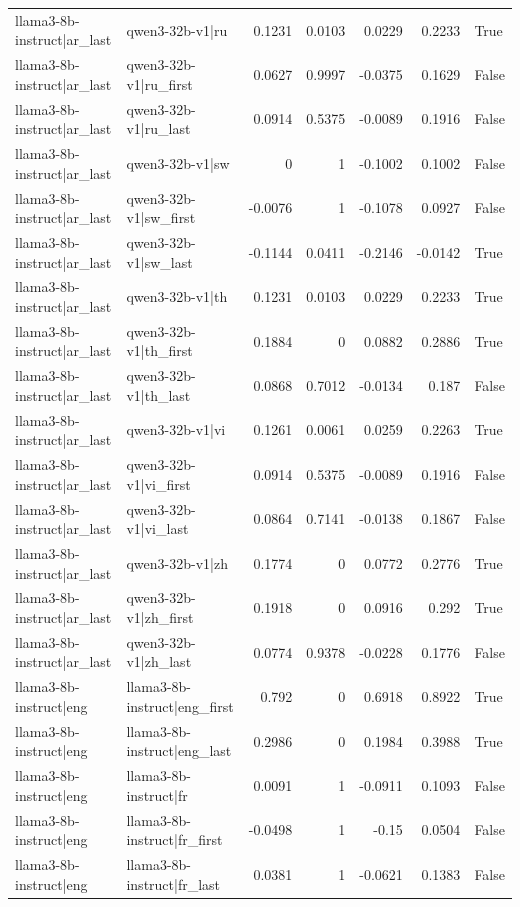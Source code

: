 \begin{table}
\begin{tabular}{l l r r r r l}
llama3-8b-instruct|ar_last & qwen3-32b-v1|ru & 0.1231 & 0.0103 & 0.0229 & 0.2233 & True \\
llama3-8b-instruct|ar_last & qwen3-32b-v1|ru_first & 0.0627 & 0.9997 & -0.0375 & 0.1629 & False \\
llama3-8b-instruct|ar_last & qwen3-32b-v1|ru_last & 0.0914 & 0.5375 & -0.0089 & 0.1916 & False \\
llama3-8b-instruct|ar_last & qwen3-32b-v1|sw & 0 & 1 & -0.1002 & 0.1002 & False \\
llama3-8b-instruct|ar_last & qwen3-32b-v1|sw_first & -0.0076 & 1 & -0.1078 & 0.0927 & False \\
llama3-8b-instruct|ar_last & qwen3-32b-v1|sw_last & -0.1144 & 0.0411 & -0.2146 & -0.0142 & True \\
llama3-8b-instruct|ar_last & qwen3-32b-v1|th & 0.1231 & 0.0103 & 0.0229 & 0.2233 & True \\
llama3-8b-instruct|ar_last & qwen3-32b-v1|th_first & 0.1884 & 0 & 0.0882 & 0.2886 & True \\
llama3-8b-instruct|ar_last & qwen3-32b-v1|th_last & 0.0868 & 0.7012 & -0.0134 & 0.187 & False \\
llama3-8b-instruct|ar_last & qwen3-32b-v1|vi & 0.1261 & 0.0061 & 0.0259 & 0.2263 & True \\
llama3-8b-instruct|ar_last & qwen3-32b-v1|vi_first & 0.0914 & 0.5375 & -0.0089 & 0.1916 & False \\
llama3-8b-instruct|ar_last & qwen3-32b-v1|vi_last & 0.0864 & 0.7141 & -0.0138 & 0.1867 & False \\
llama3-8b-instruct|ar_last & qwen3-32b-v1|zh & 0.1774 & 0 & 0.0772 & 0.2776 & True \\
llama3-8b-instruct|ar_last & qwen3-32b-v1|zh_first & 0.1918 & 0 & 0.0916 & 0.292 & True \\
llama3-8b-instruct|ar_last & qwen3-32b-v1|zh_last & 0.0774 & 0.9378 & -0.0228 & 0.1776 & False \\
llama3-8b-instruct|eng & llama3-8b-instruct|eng_first & 0.792 & 0 & 0.6918 & 0.8922 & True \\
llama3-8b-instruct|eng & llama3-8b-instruct|eng_last & 0.2986 & 0 & 0.1984 & 0.3988 & True \\
llama3-8b-instruct|eng & llama3-8b-instruct|fr & 0.0091 & 1 & -0.0911 & 0.1093 & False \\
llama3-8b-instruct|eng & llama3-8b-instruct|fr_first & -0.0498 & 1 & -0.15 & 0.0504 & False \\
llama3-8b-instruct|eng & llama3-8b-instruct|fr_last & 0.0381 & 1 & -0.0621 & 0.1383 & False \\

\end{tabular}
\end{table}
